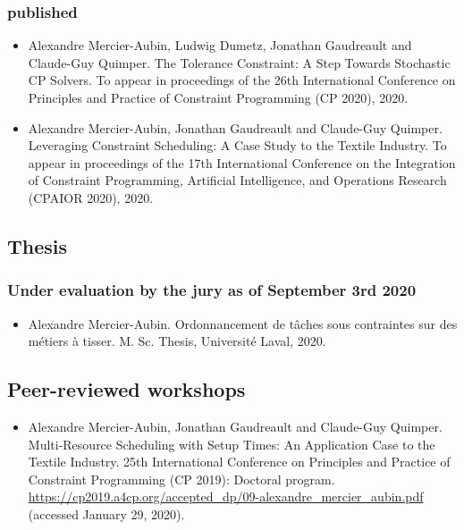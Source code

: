\documentclass[10pt]{article} %
\begin{document}
\subsubsection{published}
\begin{itemize}

\item
Alexandre Mercier-Aubin, Ludwig Dumetz, Jonathan Gaudreault and Claude-Guy Quimper. The Tolerance Constraint: A Step Towards Stochastic CP Solvers. To appear in proceedings of the  26th International Conference on Principles and Practice of Constraint Programming (CP 2020), 2020.

\item
Alexandre Mercier-Aubin, Jonathan Gaudreault and Claude-Guy Quimper. Leveraging Constraint Scheduling: A Case Study
to the Textile Industry. To appear in proceedings of the 17th International Conference on the Integration of Constraint Programming, Artificial Intelligence, and Operations Research (CPAIOR 2020), 2020.

\end{itemize}

\subsection{Thesis}
\subsubsection{Under evaluation by the jury as of September 3rd 2020}
\begin{itemize}
\item
Alexandre Mercier-Aubin. Ordonnancement de tâches sous contraintes sur des métiers à tisser. M. Sc. Thesis, Université Laval, 2020.
\end{itemize}

\subsection{Peer-reviewed workshops}
\begin{itemize}

\item
Alexandre Mercier-Aubin, Jonathan Gaudreault and Claude-Guy Quimper. Multi-Resource Scheduling with Setup Times: An Application Case to the Textile Industry. 25th International Conference on Principles and Practice of Constraint Programming (CP 2019): Doctoral program.
\url{https://cp2019.a4cp.org/accepted_dp/09-alexandre_mercier_aubin.pdf} (accessed January 29, 2020).

\end{itemize}
\end{document}
